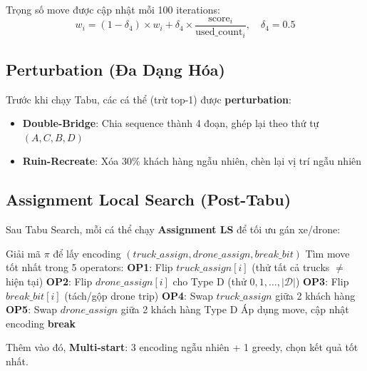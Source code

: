 \documentclass[12pt,a4paper]{article}
\begin{document}
Trọng số move được cập nhật mỗi 100 iterations:
\begin{equation}
    w_i = (1 - \delta_4) \times w_i + \delta_4 \times \frac{\text{score}_i}{\text{used\_count}_i}, \quad \delta_4 = 0.5
\end{equation}

\subsection{Perturbation (Đa Dạng Hóa)}

Trước khi chạy Tabu, các cá thể (trừ top-1) được \textbf{perturbation}:
\begin{itemize}[nosep]
    \item \textbf{Double-Bridge}: Chia sequence thành 4 đoạn, ghép lại theo thứ tự $(A, C, B, D)$
    \item \textbf{Ruin-Recreate}: Xóa 30\% khách hàng ngẫu nhiên, chèn lại vị trí ngẫu nhiên
\end{itemize}

\subsection{Assignment Local Search (Post-Tabu)}

Sau Tabu Search, mỗi cá thể chạy \textbf{Assignment LS} để tối ưu gán xe/drone:

\begin{algorithm}[h!]
\caption{Assignment Local Search (Best-Improvement)}
\begin{algorithmic}[1]
\STATE Giải mã $\pi$ để lấy encoding $(truck\_assign, drone\_assign, break\_bit)$
    \STATE Tìm move tốt nhất trong 5 operators:
    \STATE \quad \textbf{OP1}: Flip $truck\_assign[i]$ (thử tất cả trucks $\neq$ hiện tại)
    \STATE \quad \textbf{OP2}: Flip $drone\_assign[i]$ cho Type D (thử $0, 1, \ldots, |\mathcal{D}|$)
    \STATE \quad \textbf{OP3}: Flip $break\_bit[i]$ (tách/gộp drone trip)
    \STATE \quad \textbf{OP4}: Swap $truck\_assign$ giữa 2 khách hàng
    \STATE \quad \textbf{OP5}: Swap $drone\_assign$ giữa 2 khách hàng Type D
        \STATE Áp dụng move, cập nhật encoding
    \ELSE
        \STATE \textbf{break} 
    \ENDIF
\ENDFOR
\end{algorithmic}
\end{algorithm}

Thêm vào đó, \textbf{Multi-start}: 3 encoding ngẫu nhiên + 1 greedy, chọn kết quả tốt nhất.
\end{document}
